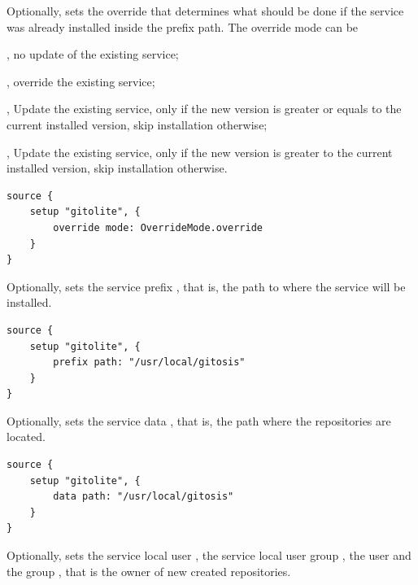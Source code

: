 Optionally, sets the override  that determines what should be done if the
service was already installed inside the prefix path. The override mode can be
\begin{compactitem}
\item {}, no update of the existing service;
\item {}, override the existing service;
\item {}, Update the existing service, only if the 
new version is greater or equals to the current installed version, 
skip installation otherwise;
\item {}, Update the existing service, only if the 
new version is greater to the current installed version, 
skip installation otherwise.
\end{compactitem}

\begin{lstlisting}[style=Java]
source {
    setup "gitolite", {
        override mode: OverrideMode.override
    }
}
\end{lstlisting}


Optionally, sets the service prefix , that is, the path to where the service
will be installed.

\begin{lstlisting}[style=Java]
source {
    setup "gitolite", {
        prefix path: "/usr/local/gitosis"
    }
}
\end{lstlisting}


Optionally, sets the service data , that is, the path where the repositories
are located.

\begin{lstlisting}[style=Java]
source {
    setup "gitolite", {
        data path: "/usr/local/gitosis"
    }
}
\end{lstlisting}


Optionally, sets the service local user , the service local user 
group , the user  and the group , that is the 
owner of new created repositories.

